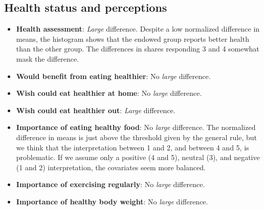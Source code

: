 \documentclass[12pt]{article}
\begin{document}
\FloatBarrier

\clearpage

\subsection{Health status and perceptions}

\begin{itemize}
  \item \textbf{Health assessment}: \emph{Large} difference.
  Despite a low normalized difference in means, the histogram shows that the endowed group reports better health than the other group. The differences in shares responding 3 and 4 somewhat mask the difference.

  \item \textbf{Would benefit from eating healthier}: No \emph{large} difference.

  \item \textbf{Wish could eat healthier at home}: No \emph{large} difference.

  \item \textbf{Wish could eat healthier out}: \emph{Large} difference.

  \item \textbf{Importance of eating healthy food}: No \emph{large} difference.
  The normalized difference in means is just above the threshold given by the general rule, but we think that the interpretation between 1 and 2, and between 4 and 5, is problematic. If we assume only a positive (4 and 5), neutral (3), and negative (1 and 2) interpretation, the covariates seem more balanced.

  \item \textbf{Importance of exercising regularly}: No \emph{large} difference.

  \item \textbf{Importance of healthy body weight}: No \emph{large} difference.
\end{itemize}
\end{document}

